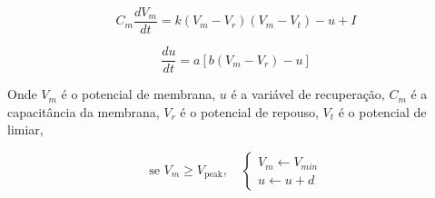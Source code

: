 
\begin{equation}
\label{eq_izhikevich_1}
C_m \frac{dV_m}{dt} = k (V_m - V_r)(V_m - V_t) - u + I
\end{equation}

\begin{equation}
\label{eq_izhikevich_2}
\frac{du}{dt} = a [b(V_m-V_r) - u]
\end{equation}

Onde $V_m$ é o potencial de membrana, $u$ é a variável de recuperação, $C_m$ é a capacitância da membrana, $V_r$ é o
potencial de repouso, $V_t$ é o potencial de limiar, 


\begin{equation}
\label{eq_izhikevich_3}
\text{se } V_m \geq V_{\text{peak}}, \quad
\begin{cases}
V_m \gets V_{min} \\
u \gets u + d
\end{cases}
\end{equation}









